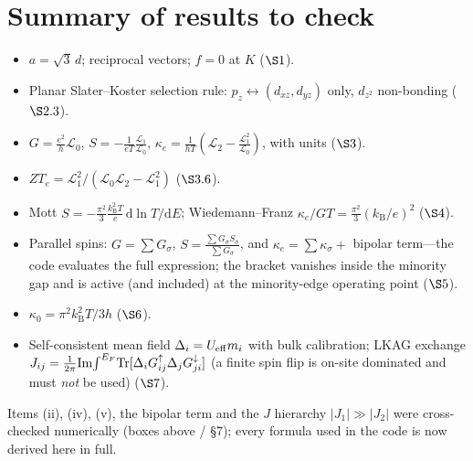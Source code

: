 \documentclass[11pt]{article}
\newcommand{\dd}{\mathrm{d}}
\newcommand{\kB}{k_{\mathrm B}}
\newcommand{\Lloc}{\mathcal{L}}
\begin{document}
\section{Summary of results to check}
\begin{itemize}
\item[(i)] $a=\sqrt3\,d$; reciprocal vectors; $f=0$ at $K$ ($\S1$).
\item[(ii)] Planar Slater--Koster selection rule: $p_z\!\leftrightarrow\!(d_{xz},d_{yz})$ only,
$d_{z^2}$ non-bonding ($\S2.3$).
\item[(iii)] $G=\tfrac{e^2}{h}\Lloc_0$, $S=-\tfrac1{eT}\tfrac{\Lloc_1}{\Lloc_0}$,
$\kappa_e=\tfrac1{hT}(\Lloc_2-\tfrac{\Lloc_1^2}{\Lloc_0})$, with units ($\S3$).
\item[(iv)] $ZT_e=\Lloc_1^2/(\Lloc_0\Lloc_2-\Lloc_1^2)$ ($\S3.6$).
\item[(v)] Mott $S=-\tfrac{\pi^2}{3}\tfrac{\kB^2 T}{e}\,\dd\ln T/\dd E$; Wiedemann--Franz
$\kappa_e/GT=\tfrac{\pi^2}{3}(\kB/e)^2$ ($\S4$).
\item[(vi)] Parallel spins: $G=\sum G_\sigma$, $S=\tfrac{\sum G_\sigma S_\sigma}{\sum G_\sigma}$,
and $\kappa_e=\sum\kappa_\sigma+$ bipolar term---the code evaluates the full expression; the
bracket vanishes inside the minority gap and is active (and included) at the minority-edge
operating point ($\S5$).
\item[(vii)] $\kappa_0=\pi^2\kB^2 T/3h$ ($\S6$).
\item[(viii)] Self-consistent mean field $\Delta_i=U_{\rm eff}m_i$ with bulk calibration; LKAG
exchange $J_{ij}=\tfrac1{2\pi}{\rm Im}\!\int^{E_F}\!{\rm Tr}[\Delta_i G^\uparrow_{ij}\Delta_j G^\downarrow_{ji}]$
(a finite spin flip is on-site dominated and must \emph{not} be used) ($\S7$).
\end{itemize}
Items (ii), (iv), (v), the bipolar term and the $J$ hierarchy $|J_1|\gg|J_2|$ were cross-checked
numerically (boxes above / \S7); every formula used in the code is now derived here in full.
\end{document}
